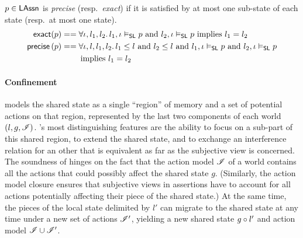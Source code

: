 \begin{definition}
  $p\in\mathsf{LAssn}$ is \emph{precise} (resp.\ \emph{exact}) if it is
  satisfied by at most one sub-state of each state (resp.\ at most one
  state).
  \begin{align*}
    \textsf{exact}(p) &==
    \forall \iota, l_1, l_2.\, l_1, \iota \mathrel{\vDash_{\mathsf{SL}}} p\text{ and }l_2, \iota
    \mathrel{\vDash_{\mathsf{SL}}} p\text{ implies } l_1 = l_2\\
    \textsf{precise} \left( p \right) &==
    \forall \iota, l, l_1, l_2.\, l_1\leq l\text{ and }l_2\leq l\text{ and }l_1, \iota \mathrel{\vDash_{\mathsf{SL}}} p\text{ and }l_2, \iota
    \mathrel{\vDash_{\mathsf{SL}}} p\\
    &\qquad\text{ implies } l_1 = l_2
  \end{align*}
\end{definition}

\paragraph{Confinement}
\colosl models the shared state as a single ``region'' of memory and a
set of potential actions on that region, represented by the last two
components of each world $(l,g,\mathscr{I})$. \colosl's most
distinguishing features are the ability to focus on a sub-part of this
shared region, to extend the shared state, and to exchange an
interference relation for an other that is equivalent as far as the
subjective view is concerned. The soundness of \colosl hinges on the
fact that the action model $\mathscr{I}$ of a world contains all the actions
that could possibly affect the shared state $g$. (Similarly, the
action model closure ensures that subjective views in assertions have
to account for all actions potentially affecting their piece of the shared
state.) At the same time, the pieces of the local state delimited by $l'$ can migrate to
the shared state at any time under a new set of actions $\mathscr{I}'$,
yielding a new shared state $g\circ l'$ and action model $\mathscr{I}
\cup \mathscr{I}'$.

